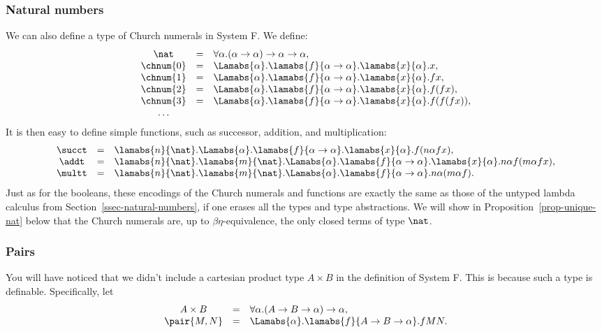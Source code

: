 \documentclass[12pt]{article}
\begin{document}
\subsubsection{Natural numbers}

We can also define a type of Church numerals in System F. We define:
\[ \begin{array}{ccl}
  \nat &=& \forall\alpha.(\alpha\to\alpha)\to\alpha\to\alpha,\\
  \chnum{0} &=& \Lamabs{\alpha}.\lamabs{f}{\alpha\to\alpha}.\lamabs{x}{\alpha}.x,\\
  \chnum{1} &=& \Lamabs{\alpha}.\lamabs{f}{\alpha\to\alpha}.\lamabs{x}{\alpha}.fx,\\
  \chnum{2} &=& \Lamabs{\alpha}.\lamabs{f}{\alpha\to\alpha}.\lamabs{x}{\alpha}.f(fx),\\
  \chnum{3} &=&
  \Lamabs{\alpha}.\lamabs{f}{\alpha\to\alpha}.\lamabs{x}{\alpha}.f(f(fx)),\\
  \ldots
\end{array}
\]
It is then easy to define simple functions, such as successor,
addition, and multiplication:
\[ \begin{array}{ccl}
  \succt &=& \lamabs{n}{\nat}.\Lamabs{\alpha}.\lamabs{f}{\alpha\to\alpha}.\lamabs{x}{\alpha}.f(n\alpha f x),\\
  \addt &=&  \lamabs{n}{\nat}.\lamabs{m}{\nat}.\Lamabs{\alpha}.\lamabs{f}{\alpha\to\alpha}.\lamabs{x}{\alpha}.n\alpha f(m\alpha fx), \\
  \multt &=& \lamabs{n}{\nat}.\lamabs{m}{\nat}.\Lamabs{\alpha}.\lamabs{f}{\alpha\to\alpha}.n\alpha (m\alpha f).
\end{array}
\]
Just as for the booleans, these encodings of the Church numerals and
functions are exactly the same as those of the untyped lambda calculus
from Section~\ref{ssec-natural-numbers}, if one erases all the types
and type abstractions.  We will show in
Proposition~\ref{prop-unique-nat} below that the Church numerals are,
up to $\beta\eta$-equivalence, the only closed terms of type $\nat$.

\subsubsection{Pairs}\label{ssec-pairs}

You will have noticed that we didn't include a cartesian product type
$A\times B$ in the definition of System F. This is because such a type
is definable. Specifically, let
\[ \begin{array}{ccl}
  A\times B &=& \forall\alpha.(A\to B\to\alpha)\to\alpha,\\
  \pair{M,N} &=& \Lamabs{\alpha}.\lamabs{f}{A\to B\to\alpha}.fMN.
\end{array}
\]
\end{document}
